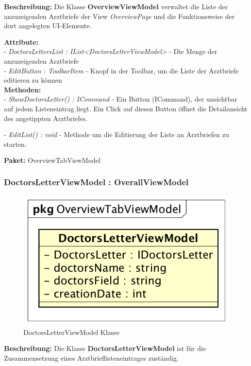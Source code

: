 \documentclass[a4paper]{scrreprt}
\begin{document}
\textbf{Beschreibung:} Die Klasse \textbf{OverviewViewModel} verwaltet die Liste der anzuzeigenden Arztbriefe der View \textit{OverviewPage} und die Funktionsweise der dort angelegten UI-Elemente.

\textbf{Attribute:}\\
- \textit{DoctorsLettersList : IList<DoctorsLetterViewModel>} - Die Menge der anzuzeigenden Arztbriefe\\
- \textit{EditButton : ToolbarItem} - Knopf in der Toolbar, um die Liste der Arztbriefe editieren zu können\\

\textbf{Methoden:}\\
- \textit{ShowDoctorsLetter() : ICommand} - Ein Button (ICommand), der unsichtbar auf jedem Listeneintrag liegt. Ein Click auf diesen Button öffnet die Detailansicht des angetippten Arztbriefes.

- \textit{EditList() : void} - Methode um die Editierung der Liste an Arztbriefen zu starten.

\textbf{Paket:} OverviewTabViewModel

\subsubsection{DoctorsLetterViewModel : OverallViewModel}
\begin{figure}[H]
\centering
\includegraphics[width=0.45\textheight]{graphics/Klassendiagramme/ViewModel/DoctorsLetterViewModel.png}
\caption{DoctorsLetterViewModel Klasse}
\end{figure}

\textbf{Beschreibung:} Die Klasse \textbf{DoctorsLetterViewModel} ist für die Zusammensetzung eines Arztbrieflisteneintrages zuständig.
\end{document}
